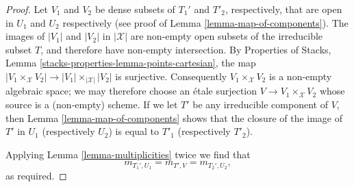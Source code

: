 \documentclass[10pt,a4paper]{amsart}
\theoremstyle{plain}
\theoremstyle{definition}
\theoremstyle{remark}
\numberwithin{equation}{subsection}
\begin{document}
\begin{proof}
Let $V_1$ and $V_2$ be dense subsets of $T_1'$ and $T'_2$, respectively,
that are open in $U_1$ and $U_2$ respectively (see proof of
Lemma \ref{lemma-map-of-components}).
The images of $|V_1|$ and $|V_2|$ in $|\mathcal{X}|$ are non-empty open
subsets of the irreducible subset $T$, and therefore have non-empty
intersection. By
Properties of Stacks, Lemma \ref{stacks-properties-lemma-points-cartesian},
the map $|V_1 \times_\mathcal{X} V_2| \to |V_1| \times_{|\mathcal{X}|} |V_2|$
is surjective. Consequently $V_1 \times_\mathcal{X} V_2$
is a non-empty algebraic space; we may therefore choose an
\'etale surjection $V \to V_1 \times_\mathcal{X} V_2$
whose source is a (non-empty) scheme.
If we let $T'$ be any irreducible component of $V$,
then Lemma \ref{lemma-map-of-components} shows that the closure of
the image of $T'$ in $U_1$ (respectively $U_2$) is equal to $T'_1$
(respectively $T'_2$).

\medskip\noindent
Applying Lemma \ref{lemma-multiplicities} twice we find
that
$$
m_{T_1', U_1} = m_{T', V} = m_{T_2', U_2},
$$
as required.
\end{proof}
\end{document}
